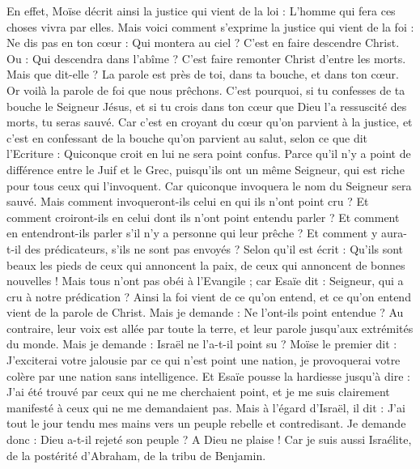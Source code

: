 \begin{multicols}{2}
En effet, Moïse décrit ainsi la justice qui vient de la loi : L'homme qui fera ces choses vivra par elles.
Mais voici comment s'exprime la justice qui vient de la foi : Ne dis pas en ton cœur : Qui montera au ciel ? C’est en faire descendre Christ.
Ou : Qui descendra dans l'abîme ? C’est faire remonter Christ d’entre les morts.
Mais que dit-elle ? La parole est près de toi, dans ta bouche, et dans ton cœur. Or voilà la parole de foi que nous prêchons.
C'est pourquoi, si tu confesses de ta bouche le Seigneur Jésus, et si tu crois dans ton cœur que Dieu l'a ressuscité des morts, tu seras sauvé.
Car c’est en croyant du cœur qu’on parvient à la justice, et c’est en confessant de la bouche qu’on parvient au salut, selon ce que dit l’Ecriture :
Quiconque croit en lui ne sera point confus.
Parce qu'il n'y a point de différence  entre le Juif et le Grec, puisqu’ils ont un même Seigneur, qui est riche pour tous ceux qui l'invoquent.
Car quiconque invoquera le nom du Seigneur sera sauvé.
Mais comment invoqueront-ils celui en qui ils n'ont point cru ? Et comment croiront-ils en celui dont ils n'ont point entendu parler ? Et comment en entendront-ils parler s'il n'y a personne qui leur prêche ?
Et comment y aura-t-il des prédicateurs, s’ils ne sont pas envoyés ? Selon qu'il est écrit : Qu’ils sont beaux les pieds de ceux qui annoncent la paix, de ceux qui annoncent de bonnes nouvelles !
Mais tous n'ont pas obéi à l'Evangile ; car Esaïe dit : Seigneur, qui a cru à notre prédication ?
Ainsi la foi vient de ce qu’on entend, et ce qu’on entend vient de la parole de Christ.
Mais je demande : Ne l'ont-ils point entendue ? Au contraire, leur voix est allée par toute la terre, et leur parole jusqu’aux extrémités du monde.
Mais je demande : Israël ne l'a-t-il point su ? Moïse le premier dit : J’exciterai votre jalousie par ce qui n'est point une nation, je provoquerai votre colère par une nation sans intelligence.
Et Esaïe pousse la hardiesse jusqu’à dire : J'ai été trouvé par ceux qui ne me cherchaient point, et je me suis clairement manifesté à ceux qui ne me demandaient pas.
Mais à l'égard d’Israël, il dit : J'ai tout le jour tendu mes mains vers un peuple rebelle et contredisant.
\VerseOne{}Je demande donc : Dieu a-t-il rejeté son peuple ? A Dieu ne plaise ! Car je suis aussi Israélite, de la postérité d'Abraham, de la tribu de Benjamin.

\end{multicols}
